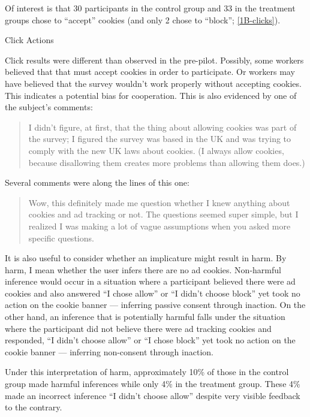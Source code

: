 Of interest is that 30 participants in the control group and 33 in the treatment groups chose to ``accept'' cookies (and only 2 chose to ``block'';  \autoref{1B-clicks}). 


\begin{table}
\caption{Click Actions}
\centering

\label{1B-clicks}
\end{table}


Click results were different than observed in the pre-pilot. Possibly, some workers believed that that must accept cookies in order to participate. Or workers may have believed that the survey wouldn't work properly without accepting cookies. This indicates a potential bias for cooperation. This is also evidenced by one of the subject's comments:

\begin{quote}
I didn't figure, at first, that the thing about allowing cookies was part of the survey; I figured the survey was based in the UK and was trying to comply with the new UK laws about cookies. (I always allow cookies, because disallowing them creates more problems than allowing them does.)
\end{quote}
Several comments were along the lines of this one:
\begin{quote}
Wow, this definitely made me question whether I knew anything about cookies and ad tracking or not. The questions seemed super simple, but I realized I was making a lot of vague assumptions when you asked more specific questions.
\end{quote}

It is also useful to consider whether an implicature might result in harm. By harm, I mean whether the user infers there are no ad cookies. Non-harmful inference would occur in a situation where a participant believed there were ad cookies and also answered ``I chose allow'' or ``I didn't choose block'' yet took no action on the cookie banner --- inferring passive consent through inaction. On the other hand, an inference that is potentially harmful falls under the situation where the participant did not believe there were ad tracking cookies and responded, ``I didn't choose allow'' or ``I chose block'' yet took no action on the cookie banner --- inferring non-consent through inaction.

Under this interpretation of harm, approximately 10\% of those in the control group made harmful inferences while only 4\% in the treatment group. These 4\% made an incorrect inference ``I didn't choose allow'' despite very visible feedback to the contrary.
